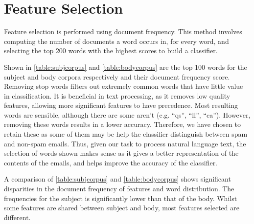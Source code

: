 \documentclass[10pt, a4paper]{article}
\begin{document}
\section{Feature Selection}

Feature selection is performed using document frequency. This method involves computing the number of documents a word occurs in, for every word, and selecting the top 200 words with the highest scores to build a classifier.

Shown in \autoref{table:subjcorpus} and \autoref{table:bodycorpus} are the top 100 words for the subject and body corpora respectively and their document frequency score. Removing stop words filters out extremely common words that have little value in classification. It is beneficial in text processing, as it removes low quality features, allowing more significant features to have precedence. Most resulting words are sensible, although there are some aren't (e.g. ``qs'', ``ll'', ``ca''). However, removing these words results in a lower accuracy. Therefore, we have chosen to retain these as some of them may be help the classifier distinguish between spam and non-spam emails. Thus, given our task to process natural language text, the selection of words shown makes sense as it gives a better representation of the contents of the emails, and helps improve the accuracy of the classifier.

A comparison of \autoref{table:subjcorpus} and \autoref{table:bodycorpus} shows significant disparities in the document frequency of features and word distribution. The frequencies for the subject is significantly lower than that of the body. Whilst some features are shared between subject and body, most features selected are different.
\end{document}

